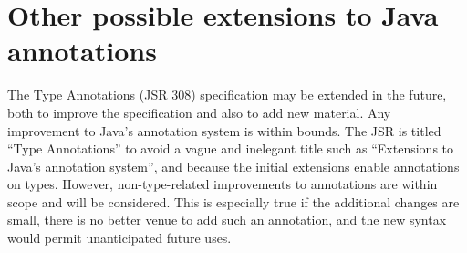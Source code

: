 \documentclass[10pt]{article}
\begin{document}

% 
% 
% 
% 
% 


\section{Other possible extensions to Java annotations\label{other-annotations}}

The Type Annotations (JSR 308) specification may be extended in the future,
both to improve the specification and also to add new material.
Any improvement to Java's annotation system is within bounds.  The JSR is
titled ``Type Annotations'' to avoid a vague and inelegant title such as
``Extensions to Java's annotation system'', and because the initial
extensions enable annotations on types.  However, non-type-related
improvements to annotations are within scope and will be considered.  This
is especially true if the additional changes are small, there is no better
venue to add such an annotation, and the new syntax would permit
unanticipated future uses.
\end{document}
